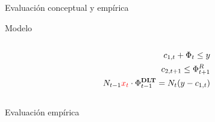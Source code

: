 \begin{frame}{Evaluación conceptual y empírica}
    
    \begin{block}{Modelo}
    \begin{minipage}[t][.20\textheight][t]{\textwidth}
        \begin{column}{0.30\textwidth}
        \vspace{-10pt} %
            \tiny
            \begin{align*}
            {c_{1,t}+\Phi_t \le y}\\
            c_{2,t+1}\le \Phi_{t+1}^R\\
            {N_{t-1}\textcolor{red}{x_t} \cdot \Phi_{t-1}^{\textbf{DLT}}=N_t(y-c_{1,t})}
            \end{align*}
        \end{column}
        \begin{column}{0.45\textwidth}
        \end{column}
    \end{minipage}
    \end{block}

    \begin{block}{Evaluación empírica}
    
    \begin{minipage}[t][.40\textheight][t]{\textwidth}


\end{minipage}
\end{block}
\end{frame}
